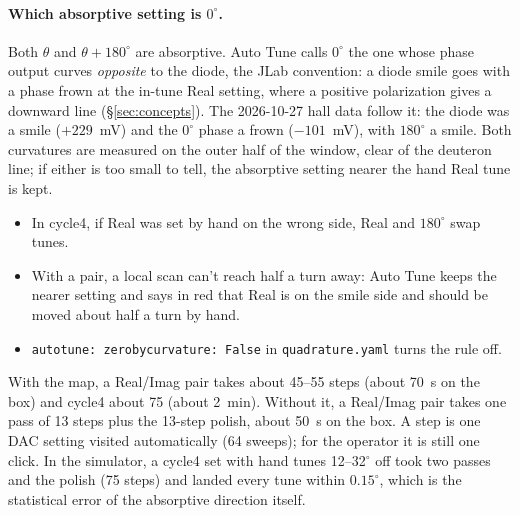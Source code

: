 \documentclass[11pt]{article}
\newcommand{\code}[1]{\texttt{\begingroup\def\_{\textunderscore\allowbreak}#1\endgroup}}
\begin{document}
\paragraph{Which absorptive setting is $0^\circ$.} Both $\theta$ and $\theta+180^\circ$ are absorptive. Auto Tune calls
$0^\circ$ the one whose phase output curves \emph{opposite} to the diode, the JLab convention: a diode smile goes with a
phase frown at the in-tune Real setting, where a positive polarization gives a downward line (\S\ref{sec:concepts}). The 2026-10-27 hall data follow it: the diode was a smile ($+229$~mV) and the
$0^\circ$ phase a frown ($-101$~mV), with $180^\circ$ a smile. Both curvatures are measured on the outer half of the
window, clear of the deuteron line; if either is too small to tell, the absorptive setting nearer the hand Real tune
is kept.
\begin{itemize}
\item In cycle4, if Real was set by hand on the wrong side, Real and $180^\circ$ swap tunes.
\item With a pair, a local scan can't reach half a turn away: Auto Tune keeps the nearer setting and says in red
  that Real is on the smile side and should be moved about half a turn by hand.
\item \code{autotune: zero\_by\_curvature: False} in \code{quadrature.yaml} turns the rule off.
\end{itemize}
With the map, a Real/Imag pair takes about 45--55 steps (about 70~s on the box) and cycle4 about 75 (about
2~min). Without it, a Real/Imag pair takes one pass of 13 steps plus the 13-step polish, about 50~s on the box. A step is one DAC
setting visited automatically (64 sweeps); for the operator it is still one click. In the simulator, a cycle4 set
with hand tunes 12--32$^\circ$ off took two passes and the polish (75 steps) and landed every tune within
$0.15^\circ$, which is the statistical error of the absorptive direction itself.
\end{document}
